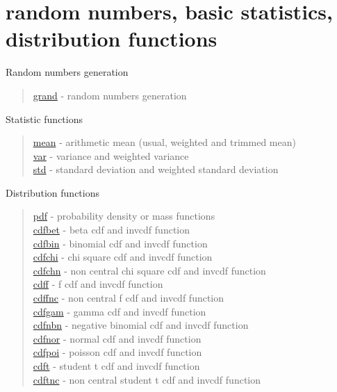 \chapter*{random numbers, basic statistics, distribution functions}

Random numbers generation

\begin{quote}
\noindent
\hyperlink{grand}{grand} - random numbers generation
\end{quote}

Statistic functions

\begin{quote}
\noindent
\hyperlink{mean}{mean} - arithmetic mean (usual, weighted and trimmed mean)\\
\hyperlink{var}{var} - variance and weighted variance\\
\hyperlink{std}{std} - standard deviation and weighted standard deviation\\
\end{quote}



Distribution functions

\begin{quote}
\noindent
\hyperlink{pdf}{pdf} - probability density or mass functions \\
\hyperlink{cdfbet}{cdfbet} - beta cdf and invcdf function \\
\hyperlink{cdfbin}{cdfbin} - binomial cdf and invcdf function \\
\hyperlink{cdfchi}{cdfchi} - chi square cdf and invcdf function \\
\hyperlink{cdfchn}{cdfchn} - non central chi square cdf and invcdf function \\
\hyperlink{cdff}{cdff} - f cdf and invcdf function \\
\hyperlink{cdffnc}{cdffnc} - non central f cdf and invcdf function \\
\hyperlink{cdfgam}{cdfgam} - gamma cdf and invcdf function \\
\hyperlink{cdfnbn}{cdfnbn} - negative binomial cdf and invcdf function \\
\hyperlink{cdfnor}{cdfnor} - normal cdf and invcdf function \\
\hyperlink{cdfpoi}{cdfpoi} - poisson cdf and invcdf function \\
\hyperlink{cdft}{cdft} - student t cdf and invcdf function \\
\hyperlink{cdftnc}{cdftnc} - non central student t cdf and invcdf function \\
\end{quote}


